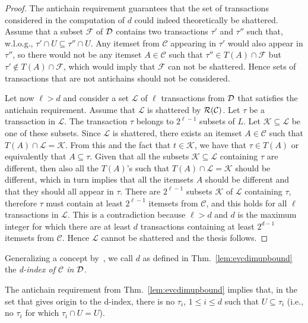 \begin{proof}
  The antichain requirement guarantees that the set of transactions considered in
  the computation of $d$ could indeed theoretically be shattered. Assume that a
  subset $\mathcal{F}$ of ${\cal D}$ contains two transactions $\tau'$ and $\tau''$
  such that, w.l.o.g., $\tau' \cap U\subseteq\tau''\cap U$. Any itemset from
  $\mathcal{C}$ appearing in $\tau'$ would also appear in $\tau''$, so there
  would not be any itemset $A\in\mathcal{C}$ such that $\tau''\in T(A)\cap
  \mathcal{F}$ but $\tau'\not\in T(A)\cap \mathcal{F}$, which would imply that
  $\mathcal{F}$ can not be shattered. Hence sets of transactions that are not
  antichains should not be considered.

  Let now $\ell>d$ and consider a set $\mathcal{L}$ of $\ell$ transactions from
  ${\cal D}$ that satisfies the antichain requirement. Assume that $\mathcal{L}$ is
  shattered by $\mathcal{R}(\mathcal{C})$. Let $\tau$ be a transaction in
  $\mathcal{L}$. The transaction $\tau$ belongs to $2^{\ell-1}$ subsets of $L$.
  Let $\mathcal{K}\subseteq \mathcal{L}$ be one of these subsets. Since
  $\mathcal{L}$ is shattered, there exists an itemset $A\in\mathcal{C}$ such
  that $T(A)\cap \mathcal{L}=\mathcal{K}$. From this and the fact that $t\in
  \mathcal{K}$, we have that $\tau\in T(A)$ or equivalently that
  $A\subseteq\tau$. Given that all the subsets $\mathcal{K}\subseteq\mathcal{L}$
  containing $\tau$ are different, then also all the $T(A)$'s such that
  $T(A)\cap \mathcal{L}=\mathcal{K}$ should be different, which in turn implies
  that all the itemsets $A$ should be different and that they should all appear
  in $\tau$. There are $2^{\ell-1}$ subsets $\mathcal{K}$ of $\mathcal{L}$
  containing $\tau$, therefore $\tau$ must contain at least $2^{\ell-1}$
  itemsets from $\mathcal{C}$, and this holds for all $\ell$ transactions in
  $\mathcal{L}$. This is a contradiction because $\ell>d$ and $d$ is the maximum
  integer for which there are at least $d$ transactions containing at least
  $2^{d-1}$ itemsets from $\mathcal{C}$. Hence $\mathcal{L}$ cannot be shattered
  and the thesis follows.
\end{proof}

Generalizing a concept by~\citet{RiondatoU14}, we call $d$ as defined in
Thm.~\ref{lem:evcdimupbound} the \emph{d-index of $\mathcal{C}$ in ${\cal D}$}.

The antichain requirement from Thm.~\ref{lem:evcdimupbound} implies that, in the
set that gives origin to the d-index, there is no $\tau_i$, $1\le i\le d$ such
that $U\subseteq\tau_i$ (i.e., no $\tau_i$ for which $\tau_i\cap U=U$).


